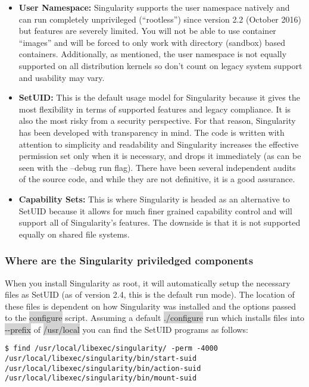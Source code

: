 \documentclass[a4paper]{article}
\begin{document}
\begin{itemize}
\item \textbf{User Namespace:} Singularity supports the user namespace natively and can run completely unprivileged (“rootless”) since version 2.2 (October 2016) but features are severely limited. You will not be able to use container “images” and will be forced to only work with directory (sandbox) based containers. Additionally, as mentioned, the user namespace is not equally supported on all distribution kernels so don’t count on legacy system support and usability may vary.
\item \textbf{SetUID:} This is the default usage model for Singularity because it gives the most flexibility in terms of supported features and legacy compliance. It is also the most risky from a security perspective. For that reason, Singularity has been developed with transparency in mind. The code is written with attention to simplicity and readability and Singularity increases the effective permission set only when it is necessary, and drops it immediately (as can be seen with the --debug run flag). There have been several independent audits of the source code, and while they are not definitive, it is a good assurance.
\item \textbf{Capability Sets:} This is where Singularity is headed as an alternative to SetUID because it allows for much finer grained capability control and will support all of Singularity’s features. The downside is that it is not supported equally on shared file systems.

\end{itemize}

\subsubsection{Where are the Singularity priviledged components}

When you install Singularity as root, it will automatically setup the necessary files as SetUID (as of version 2.4, this is the default run mode). The location of these files is dependent on how Singularity was installed and the options passed to the \colorbox{lightgray}{configure} script. Assuming a default \colorbox{lightgray}{./configure} run which installs files into \colorbox{lightgray}{-{}-prefix} of \colorbox{lightgray}{/usr/local} you can find the SetUID programs as follows:

\begin{lstlisting}[frame=single]
$ find /usr/local/libexec/singularity/ -perm -4000
/usr/local/libexec/singularity/bin/start-suid
/usr/local/libexec/singularity/bin/action-suid
/usr/local/libexec/singularity/bin/mount-suid
\end{lstlisting}
\end{document}
